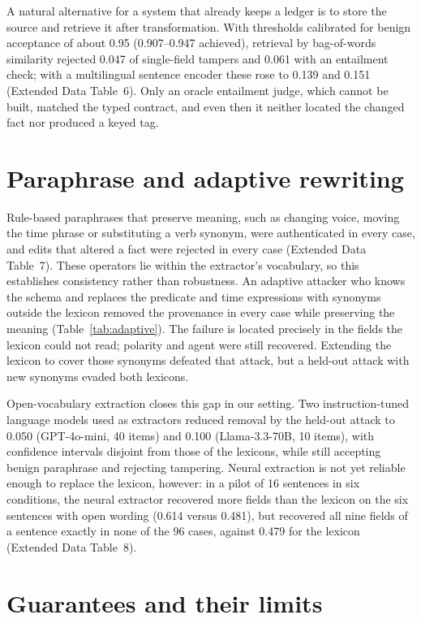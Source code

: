 \documentclass[12pt]{article}
\begin{document}
A natural alternative for a system that already keeps a ledger is to store the source and retrieve it after transformation. With thresholds calibrated for benign acceptance of about 0.95 (0.907--0.947 achieved), retrieval by bag-of-words similarity rejected 0.047 of single-field tampers and 0.061 with an entailment check; with a multilingual sentence encoder these rose to 0.139 and 0.151 (Extended Data Table~6). Only an oracle entailment judge, which cannot be built, matched the typed contract, and even then it neither located the changed fact nor produced a keyed tag.

\section*{Paraphrase and adaptive rewriting}

Rule-based paraphrases that preserve meaning, such as changing voice, moving the time phrase or substituting a verb synonym, were authenticated in every case, and edits that altered a fact were rejected in every case (Extended Data Table~7). These operators lie within the extractor's vocabulary, so this establishes consistency rather than robustness. An adaptive attacker who knows the schema and replaces the predicate and time expressions with synonyms outside the lexicon removed the provenance in every case while preserving the meaning (Table~\ref{tab:adaptive}). The failure is located precisely in the fields the lexicon could not read; polarity and agent were still recovered. Extending the lexicon to cover those synonyms defeated that attack, but a held-out attack with new synonyms evaded both lexicons.

Open-vocabulary extraction closes this gap in our setting. Two instruction-tuned language models used as extractors reduced removal by the held-out attack to 0.050 (GPT-4o-mini, 40 items) and 0.100 (Llama-3.3-70B, 10 items), with confidence intervals disjoint from those of the lexicons, while still accepting benign paraphrase and rejecting tampering. Neural extraction is not yet reliable enough to replace the lexicon, however: in a pilot of 16 sentences in six conditions, the neural extractor recovered more fields than the lexicon on the six sentences with open wording (0.614 versus 0.481), but recovered all nine fields of a sentence exactly in none of the 96 cases, against 0.479 for the lexicon (Extended Data Table~8).

\section*{Guarantees and their limits}
\end{document}
